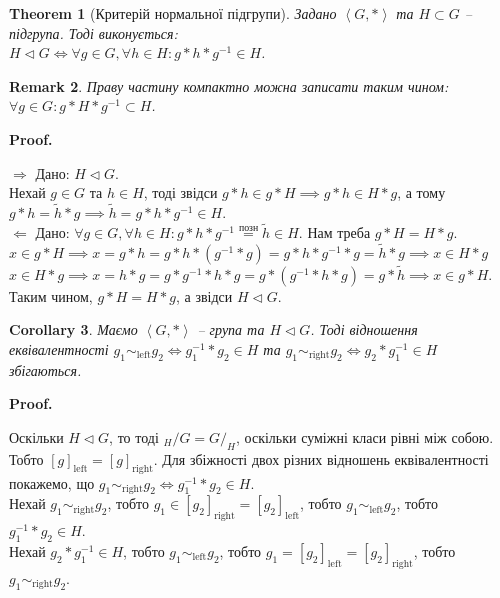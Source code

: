 \documentclass[a4paper, 10pt]{article}
\makeatletter
\theoremstyle{theoremdd}
\newtheorem{theorem}{Theorem}[subsection]
\theoremstyle{theoremdd}
\theoremstyle{theoremdd}
\theoremstyle{theoremdd}
\theoremstyle{theoremdd}
\theoremstyle{theoremdd}
\theoremstyle{theoremdd}
\theoremstyle{theoremdd}
\theoremstyle{theoremdd}
\theoremstyle{theoremdd}
\theoremstyle{theoremdd}
\newtheorem{remark}[theorem]{Remark}
\theoremstyle{theoremdd}
\theoremstyle{theoremdd}
\theoremstyle{theoremdd}
\newtheorem{corollary}[theorem]{Corollary}
\theoremstyle{theoremdd}
\renewenvironment{proof}[1][Proof.\\]{\par
\pushQED{\hfill \qed}%
\normalfont \topsep6\p@\@plus6\p@\relax
\trivlist
\item\relax
{\bfseries
#1\@addpunct{.}}\hspace\labelsep\ignorespaces
}{%
\popQED\endtrivlist\@endpefalse
}
\makeatother
\begin{document}
\begin{theorem}[Критерій нормальної підгрупи]
Задано $\left<G,* \right>$ та $H \subset G$ -- підгрупа. Тоді виконується:\\
$H \triangleleft G \iff \forall g \in G, \forall h \in H: g*h*g^{-1} \in H$.
\end{theorem}

\begin{remark}
Праву частину компактно можна записати таким чином: $\forall g \in G: g*H*g^{-1} \subset H$.
\end{remark}

\begin{proof}
$\boxed{\Rightarrow}$ Дано: $H \triangleleft G$.\\
Нехай $g \in G$ та $h \in H$, тоді звідси $g*h \in g*H \implies g*h \in H*g$, а тому $g*h = \tilde{h}*g \implies \tilde{h} = g*h*g^{-1} \in H$.
\bigskip \\
$\boxed{\Leftarrow}$ Дано: $\forall g \in G, \forall h \in H: g*h*g^{-1} \overset{\text{позн}}{=} \tilde{h} \in H$. Нам треба $g*H = H*g$.\\
$x \in g*H \implies x = g*h = g*h*(g^{-1}*g) = g*h*g^{-1}*g = \tilde{h}*g \implies x \in H*g$\\
$x \in H*g \implies x = h*g = g*g^{-1}*h*g = g*(g^{-1}*h*g) = g*\tilde{h} \implies x \in g*H$.\\
Таким чином, $g*H = H*g$, а звідси $H \triangleleft G$.
\end{proof}

\begin{corollary}
Маємо $\left< G, * \right>$ -- група та $H \triangleleft G$. Тоді відношення еквівалентності $g_1 \sim_{\text{left}} g_2 \iff g_1^{-1}*g_2 \in H$ та $g_1 \sim_{\text{right}} g_2 \iff g_2*g_1^{-1} \in H$ збігаються.
\end{corollary}

\begin{proof}
Оскільки $H \triangleleft G$, то тоді ${}_{H}/G = G/_H$, оскільки суміжні класи рівні між собою. Тобто $[g]_{\text{left}} = [g]_{\text{right}}$. Для збіжності двох різних відношень еквівалентності покажемо, що $g_1 \sim_{\text{right}} g_2 \iff g_1^{-1}*g_2 \in H$.\\
Нехай $g_1 \sim_{\text{right}} g_2$, тобто $g_1 \in [g_2]_{\text{right}} = [g_2]_{\text{left}}$, тобто $g_1 \sim_{\text{left}} g_2$, тобто $g_1^{-1}*g_2 \in H$.\\
Нехай $g_2*g_1^{-1} \in H$, тобто $g_1 \sim_{\text{left}} g_2$, тобто $g_1 = [g_2]_{\text{left}} = [g_2]_{\text{right}}$, тобто $g_1 \sim_{\text{right}} g_2$.
\end{proof}
\end{document}

